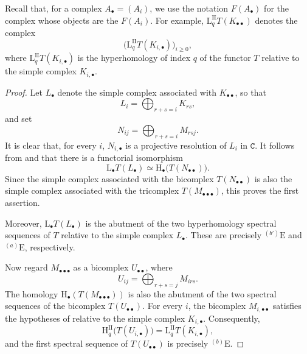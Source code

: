 \documentclass[oneside]{amsart}
\theoremstyle{ega-env-style}
\theoremstyle{ega-thm-env-style}
\theoremstyle{ega-defn-env-style}
\def\cat{\mathtt}                   %
\def\geq{\geqslant}                 %
\def\HH{\mathrm{H}}                 %
\def\LL{\mathrm{L}}                 %
\def\isoto{\simeq} %
\begin{document}
Recall that, for a complex $A_\bullet=(A_i)$, we use the notation
$F(A_\bullet)$ for the complex whose objects are the $F(A_i)$.
For example, $\LL^{\mathrm{II}}_qT(K_{\bullet\bullet})$ denotes the complex
\[
  \bigl(\LL^{\mathrm{II}}_qT(K_{i,\bullet})\bigr)_{i\geq 0},
\]
where $\LL^{\mathrm{II}}_qT(K_{i,\bullet})$ is the hyperhomology of index
$q$ of the functor $T$ relative to the simple complex $K_{i,\bullet}$.

\begin{proof}
Let $L_\bullet$ denote the simple complex associated with
$K_{\bullet\bullet}$, so that
\[
  L_i=\bigoplus_{r+s=i}K_{rs},
\]
and set
\[
  N_{ij}=\bigoplus_{r+s=i}M_{rsj}.
\]
It is clear that, for every $i$, $N_{i,\bullet}$ is a projective resolution
of $L_i$ in $\cat{C}$.
It follows from  and  that there is a
functorial isomorphism
\[
  \LL_\bullet T(L_\bullet)
  \isoto
  \HH_\bullet\bigl(T(N_{\bullet\bullet})\bigr).
\]
Since the simple complex associated with the bicomplex
$T(N_{\bullet\bullet})$ is also the simple complex associated with the
tricomplex $T(M_{\bullet\bullet\bullet})$, this proves the first assertion.

Moreover, $\LL_\bullet T(L_\bullet)$ is the abutment of the two
hyperhomology spectral sequences  of $T$ relative to the
simple complex $L_\bullet$.
These are precisely ${}^{(b')}\mathrm{E}$ and ${}^{(a)}\mathrm{E}$,
respectively.

Now regard $M_{\bullet\bullet\bullet}$ as a bicomplex
$U_{\bullet\bullet}$, where
\[
  U_{ij}=\bigoplus_{r+s=j}M_{irs}.
\]
The homology $\HH_\bullet(T(M_{\bullet\bullet\bullet}))$ is also the
abutment of the two spectral sequences of the bicomplex
$T(U_{\bullet\bullet})$.
For every $i$, the bicomplex $M_{i,\bullet\bullet}$ satisfies the
hypotheses of  relative to the simple complex
$K_{i,\bullet}$.
Consequently,
\[
  \HH^{\mathrm{II}}_q\bigl(T(U_{i,\bullet})\bigr)
  =
  \LL^{\mathrm{II}}_qT(K_{i,\bullet}),
\]
and the first spectral sequence of $T(U_{\bullet\bullet})$ is precisely
${}^{(b)}\mathrm{E}$.


\end{proof}
\end{document}
